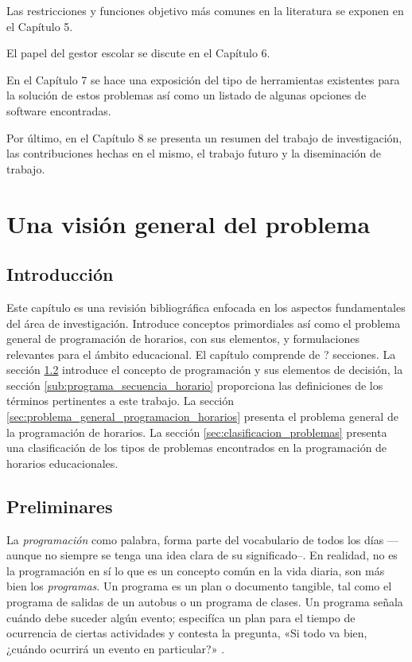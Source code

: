 \documentclass[draft,12pt,headsepline,footsepline,paper=letter]{scrreprt}
\begin{document}
Las restricciones y funciones objetivo más comunes en la literatura se exponen en el Capítulo 5.

El papel del gestor escolar se discute en el Capítulo 6.

En el Capítulo 7 se hace una exposición del tipo de herramientas existentes para la solución de estos problemas así como un listado de algunas opciones de software encontradas.

Por último, en el Capítulo 8 se presenta un resumen del trabajo de investigación, las contribuciones hechas en el mismo, el trabajo futuro y la diseminación de trabajo.

\chapter{Una visión general del problema}

\section{Introducción}

Este capítulo es una revisión bibliográfica enfocada en los aspectos fundamentales del área de investigación.
Introduce conceptos primordiales así como el problema general de programación de horarios, con sus elementos, y formulaciones relevantes para el ámbito educacional.
El capítulo comprende de ? secciones. La sección \ref{sec:preliminares} introduce el concepto de programación y sus elementos de decisión, la sección \ref{sub:programa_secuencia_horario} proporciona las definiciones de los términos pertinentes a este trabajo. La sección \ref{sec:problema_general_programacion_horarios} presenta el problema general de la programación de horarios. La sección \ref{sec:clasificacion_problemas} presenta una clasificación de los tipos de problemas encontrados en la programación de horarios educacionales.

\section{Preliminares}
\label{sec:preliminares}

La \textit{programación} como palabra, forma parte del vocabulario de todos los días —aunque no siempre se tenga una idea clara de su significado–. En realidad, no es la programación en sí lo que es un concepto común en la vida diaria, son más bien los \textit{programas}. Un programa es un plan o documento tangible, tal como el programa de salidas de un autobus o un programa de clases. Un programa señala cuándo debe suceder algún evento; especifíca un plan para el tiempo de ocurrencia de ciertas actividades y contesta la pregunta, «Si todo va bien, ¿cuándo ocurrirá un evento en particular?» \cite[p.~1]{Baker2009}. 
\end{document}
